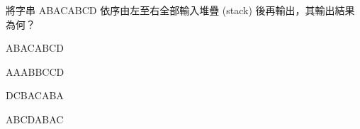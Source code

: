 \ifx\ntpcNinetyThree\undefined[93學年基北區] \fi
將字串 ABACABCD 依序由左至右全部輸入堆疊 (stack) 後再輸出，其輸出結果為何？
  \begin{optionlist}
  \item ABACABCD
  \item AAABBCCD
  \item DCBACABA\label{ntpc-93-a13}
  \item ABCDABAC
  \end{optionlist}